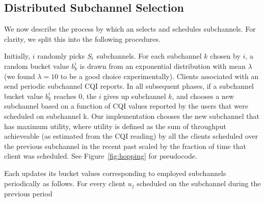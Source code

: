  


\subsection{Distributed Subchannel Selection}
  \label{sec:channel-selection}
  
We now describe the process by which an \eNB selects and schedules subchannels. 
For clarity, we split this  into the following procedures. 
  

Initially, \eNB $i$ randomly picks $\id{S}_i$ subchannels. 
For each subchannel $k$ chosen by $i$, a random bucket value $b^{i}_{k}$ is drawn from an exponential distribution with mean $\lambda$ (we found $\lambda = 10$ to be a good choice experimentally). 
Clients associated with an \eNB send periodic subchannel CQI reports. 
In all subsequent phases, if a subchannel bucket value $b^{i}_{k}$ reaches $0$, the \eNB $i$ gives up subchannel $k$, and chooses a new subchannel based on a function of CQI values reported by the users that were scheduled on subchannel k.
Our implementation chooses the new subchannel that has maximum utility, where utility is defined as the sum of throughput achieveable (as estimated from the CQI reading) by all the clients scheduled over the previous subchannel in the recent past scaled by the fraction of time that client was scheduled. 
See Figure~\ref{fig:hopping} for pseudocode. 

    Each \eNB updates its bucket values corresponding to employed subchannels periodically as follows. For every client $u_j$ scheduled on the subchannel during the previous period

